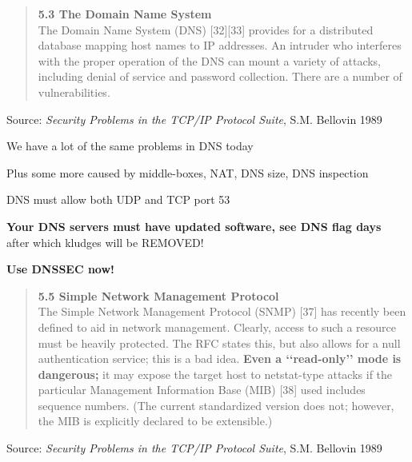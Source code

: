 \documentclass[Screen16to9,17pt]{foils}
\begin{document}

\begin{quote}
{\bf 5.3 The Domain Name System}\\
The Domain Name System (DNS) [32][33] provides for a distributed database mapping host names to IP addresses. An intruder who interferes with the proper operation of the DNS can mount a variety of attacks, including denial of service and password collection. There are a number of vulnerabilities.
\end{quote}
Source: \emph{Security Problems in the TCP/IP Protocol Suite}, S.M. Bellovin 1989\\

\begin{list1}
\item We have a lot of the same problems in DNS today
\item Plus some more caused by middle-boxes, NAT, DNS size, DNS inspection
\begin{list2}
\item DNS must allow both UDP and TCP port 53
\item {\bf Your DNS servers must have updated software, see DNS flag days}\\
 after which kludges will be REMOVED!
\item {\bf Use DNSSEC now!}
\end{list2}
\end{list1}


\begin{quote}
{\bf 5.5 Simple Network Management Protocol}\\
The Simple Network Management Protocol (SNMP) [37] has recently been defined to aid in network management. Clearly, access to such a resource must be heavily protected. The RFC states this, but also allows for a null authentication service; this is a bad idea. {\bf Even a ‘‘read-only’’ mode is dangerous;} it may expose the target host to netstat-type attacks if the particular Management Information Base (MIB) [38] used includes sequence numbers. (The current standardized version does not; however, the MIB is explicitly declared to be extensible.)
\end{quote}
Source: \emph{Security Problems in the TCP/IP Protocol Suite}, S.M. Bellovin 1989\\
\end{document}
